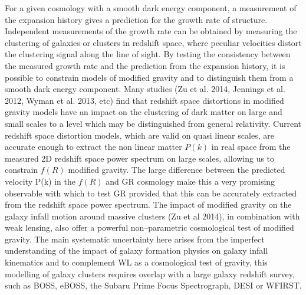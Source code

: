 For a given cosmology with a smooth dark energy component, a measurement of the expansion history gives a prediction for the growth rate of structure. Independent measurements of the growth rate can be obtained by measuring the clustering of galaxies or clusters in redshift space, where peculiar velocities distort the clustering signal along the line of sight. By testing the consistency between the measured growth rate and the prediction from the expansion history, it is possible to constrain models of modified gravity and to distinguish them from a smooth dark energy component.
Many studies (Zu et al. 2014, Jennings et al. 2012, Wyman et al. 2013, etc) find that redshift space distortions in modified gravity models have an impact on the clustering of dark matter on large and small scales to a level which may be distinguished from general relativity. Current redshift space distortion models, which are valid on quasi linear scales, are accurate enough to extract the non linear matter $P(k)$ in real space from the measured 2D redshift space power spectrum on large scales, allowing us to constrain $f(R)$ modified gravity. The large difference between the predicted velocity P(k) in the $f(R)$ and GR cosmology make this a very promising observable with which to test GR provided that this can be accurately extracted from the redshift space power spectrum. The impact of modified gravity on the galaxy
infall motion around massive clusters (Zu et al 2014),  in combination with weak lensing, also offer
a powerful non–parametric cosmological test of modified gravity. The main systematic uncertainty here arises from the imperfect understanding of the impact of galaxy formation physics on galaxy infall kinematics and to complement
WL as a cosmological test of gravity, this modelling of
galaxy clusters requires overlap with a large galaxy redshift survey,
such as BOSS, eBOSS, the Subaru Prime Focus
Spectrograph, DESI or WFIRST. 

